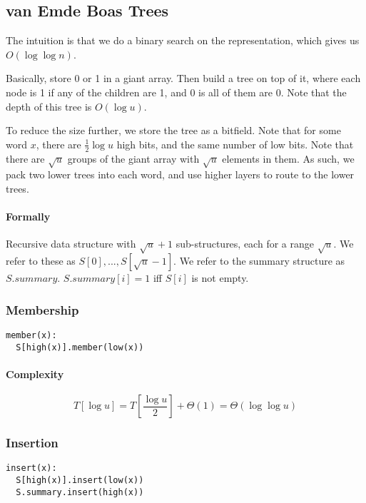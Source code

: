 \documentclass[a4paper]{article}
\begin{document}
\subsection{van Emde Boas Trees}
The intuition is that we do a binary search on the representation, which gives us $O(\log \log n)$.

Basically, store 0 or 1 in a giant array. Then build a tree on top of it, where each node is 1 if any of the children are 1, and 0 is all of them are 0. Note that the depth of this tree is $O(\log u)$.


To reduce the size further, we store the tree as a bitfield. Note that for some word $x$, there are $\frac{1}{2}\log u$ high bits, and the same number of low bits. Note that there are $\sqrt{u}$ groups of the giant array with $\sqrt{u}$ elements in them. As such, we pack two lower trees into each word, and use higher layers to route to the lower trees.

\paragraph{Formally}
Recursive data structure with $\sqrt{u}+1$ sub-structures, each for a range $\sqrt{u}$. We refer to these as $S[0],...,S[\sqrt{u}-1]$. We refer to the summary structure as $S.summary$. $S.summary[i]=1$ iff $S[i]$ is not empty.

\subsubsection{Membership}
\begin{lstlisting}[frame=L]
member(x):
  S[high(x)].member(low(x))
\end{lstlisting}

\paragraph{Complexity}
\[T[\log u] = T\left[\frac{\log u}{2}\right]+\Theta(1)=\Theta(\log\log u)\]

\subsubsection{Insertion}
\begin{lstlisting}[frame=L]
insert(x):
  S[high(x)].insert(low(x))
  S.summary.insert(high(x))
\end{lstlisting}
\end{document}
